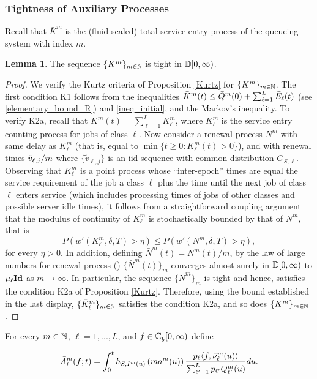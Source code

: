 \documentclass{article}
\theoremstyle{definition}
\newtheorem{lemma}[theorem]{Lemma}
\numberwithin{equation}{section}
\begin{document}
\subsubsection{Tightness of Auxiliary Processes}
Recall that $\bar K^m$ is the (fluid-scaled) total service entry process of the queueing system with index $m$.
\begin{lemma}\label{lem_Ktight}
The sequence $\{\bar K^m\}_{m\in\mathbb{N}}$ is tight in $\mathbb{D}[0,\infty)$.
\end{lemma}
\begin{proof}
We verify the Kurtz criteria of Proposition \ref{Kurtz} for $\{\bar K^m\}_{m\in\mathbb{N}}$. The first condition K1 follows from the inequalities $\bar K^m(t)\leq \bar Q^m(0)+\sum_{\ell=1}^L\bar{E}_\ell(t)$ (see \eqref{elementary_bound_R}) and \eqref{ineq_initial}, and the Markov's inequality. To verify K2a, recall that $K^m(t)=\sum_{\ell=1}^L K^m_\ell$, where $K^m_\ell$ is the service entry counting process for jobs of class $\ell$. Now consider a renewal process $N^m$ with same delay as $K^m_\ell$ (that is, equal to $\min\{t\geq0: K^m_\ell(t)>0\}$), and with renewal times $\tilde {v}_{\ell,j}/m$ where $\{\tilde v_{\ell,j}\}$ is an iid sequence   with common distribution $G_{S,\ell}$. Observing that $K^m_\ell$ is a point process whose ``inter-epoch'' times are equal the service requirement of the job a class $\ell$ plus the time until the next job of class $\ell$ enters service (which includes processing times of jobs of other classes and possible server idle times), it follows from a straightforward coupling argument that the modulus of continuity of $K^m_\ell $ is stochastically bounded by that of $N^m$, that is \[P(w'(K^m_\ell,\delta,T)>\eta)\leq P(w'(N^m,\delta,T)>\eta),\] for every $\eta>0$. In addition, defining $\bar N^m(t)=N^m(t)/m$, by the law of large numbers for renewal process (\cite[Theorem 5.10]{CheYao2001}) $\{\bar N^m(t)\}_m$ converges almost surely in $\mathbb{D}[0,\infty)$ to $\mu_\ell\textbf{Id}$ as $m\to\infty$. In particular, the sequence $\{\bar N^m\}_m$ is tight and hence, satisfies the condition K2a of Proposition \ref{Kurtz}. Therefore, using the bound established in the last display, $\{\bar K_\ell^m\}_{m\in\mathbb{N}}$ satisfies the condition K2a, and so does $\{\bar K^m\}_{m\in\mathbb{N}}$.

\end{proof}

For every $m\in\mathbb{N}$, $\ell=1,...,L$, and $f\in\mathbb{C}_b^{1}[0,\infty)$ define

\begin{equation}\label{def_Am}
  \bar A^m_\ell(f;t)= \int_{0}^t h_{S,I^m(u)}\left(ma^m(u)\right) \frac{p_\ell \langle f,\bar{\nu}^m_\ell(u)\rangle}{\sum_{\ell'=1}^Lp_{\ell'}\bar {Q}^m_{\ell'}(u)} du.
\end{equation}
\end{document}
